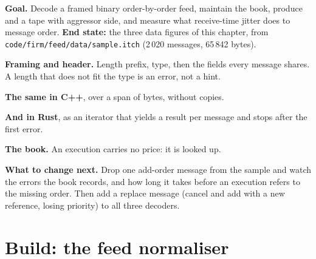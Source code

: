 \begin{tutorial}
\textbf{Goal.} Decode a framed binary order-by-order feed, maintain the book,
produce  and a tape with aggressor side, and measure what receive-time
jitter does to message order. \textbf{End state:} the three data figures of
this chapter, from \texttt{code/firm/feed/data/sample.itch} (2\,020 messages,
65\,842 bytes).
\begin{tutsteps}
\item \textbf{Framing and header.} Length prefix, type, then the fields every
message shares. A length that does not fit the type is an error, not a
hint.
\label{lst:m1:reading-market-data:py}
\item \textbf{The same in C++}, over a span of bytes, without copies.
\label{lst:m1:reading-market-data:cpp}
\item \textbf{And in Rust}, as an iterator that yields a result per message
and stops after the first error.
\label{lst:m1:reading-market-data:rs}
\item \textbf{The book.} An execution carries no price: it is looked up.
\label{lst:m1:reading-market-data:apply}
\end{tutsteps}
\textbf{What to change next.} Drop one add-order message from the sample and
watch the errors the book records, and how long it takes before an execution
refers to the missing order. Then add a replace message (cancel and add
with a new reference, losing priority) to all three decoders.
\end{tutorial}

\section{Build: the feed normaliser}\label{bld:m1:reading-market-data:feed}

